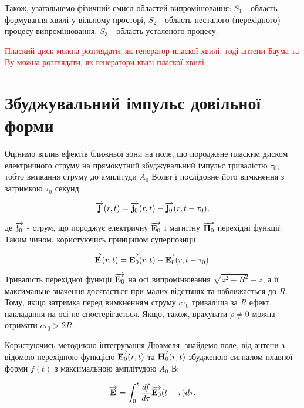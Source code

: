 Також, узагальнемо фізичний смисл областей випромінювання: $ S_1 $ -
область формування хвилі у вільному просторі, $ S_2 $ - область 
несталого (перехідного) процесу випромінювання, $ S_3 $ - область
усталеного процесу.

\textcolor{red} { Плаский диск можна розглядати, як генератор пласкої 
хвилі, тоді антени Баума та Ву можна розглядати, як генератори 
квазі-пласкої хвилі }

\section{Збуджувальний імпульс довільної форми}

Оцінимо вплив ефектів ближньої зони на поле, що породжене пласким диском 
електричного струму на прямокутний збуджувальний імпульс тривалістю 
$ \tau_0 $, тобто вмикання струму до амплітуди $ A_0 $ Вольт і послідовне 
його вимкнення з затримкою $ \tau_0 $ секунд:

\begin{equation}
\overrightarrow{\mathbf j} (r,t) = \overrightarrow{\mathbf j_0} (r,t) - \overrightarrow{\mathbf j_0} (r,t-\tau_0),
\end{equation}

де $ \overrightarrow{\mathbf j_0} $ - струм, що породжує електричну $ \overrightarrow{\mathbf E_0} $ і магнітну 
$ \overrightarrow{\mathbf H_0} $ перехідні функції. Таким чином, користуючись принципом 
суперпозиції

\begin{equation}
\overrightarrow{\mathbf E} (r,t) = \overrightarrow{\mathbf E_0} (r,t) - \overrightarrow{\mathbf E_0} (r,t-\tau_0).
\end{equation}

Тривалість перехідної функції $ \overrightarrow{\mathbf E_0} $ на осі випромінювання 
$ \sqrt{z^2+R^2} - z $, а її максимальне значення досягається при малих 
відствнях та наближається до $ R $. Тому, якщо затримка перед вимкненням 
струму $ c \tau_0 $ триваліша за $ R $ ефект накладання на осі не 
спостерігається. Якщо, також, врахувати $ \rho \neq 0 $ можна отримати 
$ c \tau_0 > 2R $.

Користуючись методикою інтегрування Дюамеля,
\cite[ст. 40]{imp:Kharkevich1950} знайдемо поле, від антени з відомою 
перехідною функцією $ \overrightarrow{\mathbf E_0} (r,t) $ та $ \overrightarrow{\mathbf H_0} (r,t) $ збудженою 
сигналом плавної форми $ f(t) $ з максимальною амплітудою $ A_0 $ В:

\begin{equation} \label{eq:duhamel}
\overrightarrow{\mathbf E} = \int_0^t \frac{d f}{d \tau} \overrightarrow{\mathbf E_0} (t - \tau) d \tau.
\end{equation}

